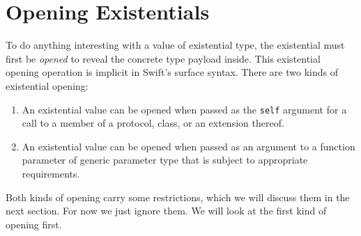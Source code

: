 \documentclass[../generics]{subfiles}
\begin{document}
\section{Opening Existentials}\label{sec:opening existentials}

To do anything interesting with a value of existential type, the existential must first be \emph{opened} to reveal the concrete type payload inside. This existential opening operation is implicit in Swift's surface syntax. There are two kinds of existential opening:
\begin{enumerate}
\item An existential value can be opened when passed as the \texttt{self} argument for a call to a member of a protocol, class, or an extension thereof.

\item An existential value can be opened when passed as an argument to a function parameter of generic parameter type that is subject to appropriate requirements.
\end{enumerate}
Both kinds of opening carry some restrictions, which we will discuss them in the next section. For now we just ignore them. We will look at the first kind of opening first.
\end{document}
